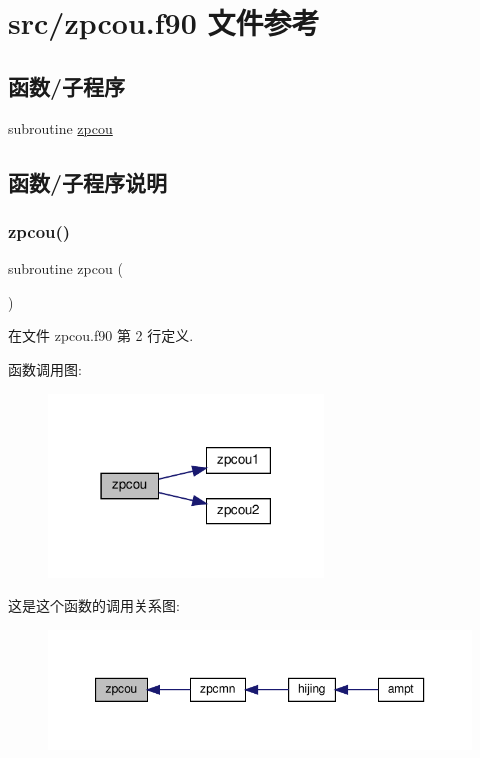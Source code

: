 \hypertarget{zpcou_8f90}{}\section{src/zpcou.f90 文件参考}
\label{zpcou_8f90}
\subsection*{函数/子程序}
\begin{DoxyCompactItemize}
\item 
subroutine \mbox{\hyperlink{zpcou_8f90_a54f3ead25f485e665e62dadcd309550f}{zpcou}}
\end{DoxyCompactItemize}


\subsection{函数/子程序说明}
\mbox{\label{zpcou_8f90_a54f3ead25f485e665e62dadcd309550f}} 
\subsubsection{\texorpdfstring{zpcou()}{zpcou()}}
{\footnotesize\ttfamily subroutine zpcou (\begin{DoxyParamCaption}{ }\end{DoxyParamCaption})}



在文件 zpcou.\+f90 第 2 行定义.

函数调用图\+:
\nopagebreak
\begin{figure}[H]
\begin{center}
\leavevmode
\includegraphics[width=207pt]{zpcou_8f90_a54f3ead25f485e665e62dadcd309550f_cgraph}
\end{center}
\end{figure}
这是这个函数的调用关系图\+:
\nopagebreak
\begin{figure}[H]
\begin{center}
\leavevmode
\includegraphics[width=350pt]{zpcou_8f90_a54f3ead25f485e665e62dadcd309550f_icgraph}
\end{center}
\end{figure}
